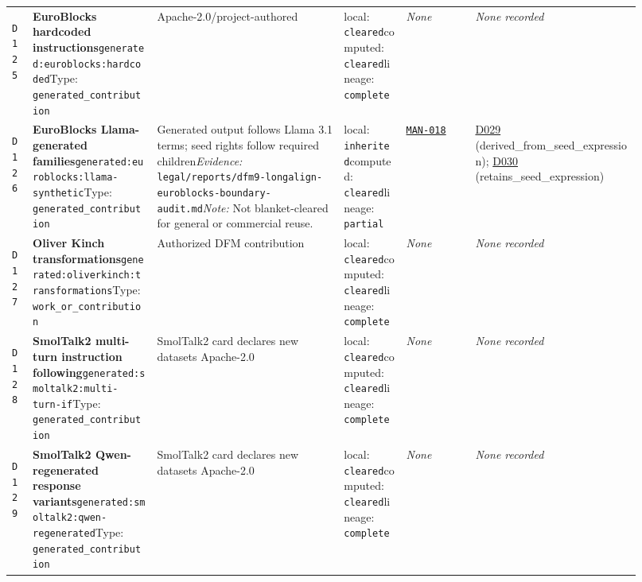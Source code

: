 \documentclass[9pt,a4paper]{article}
\newcommand{\depid}[1]{\hypertarget{dep:#1}{\texttt{#1}}}
\begin{document}
\begin{landscape}
\begin{longtable}{@{}L{0.035\linewidth}L{0.185\linewidth}L{0.27\linewidth}L{0.09\linewidth}L{0.10\linewidth}L{0.24\linewidth}@{}}
\depid{D125} & \textbf{EuroBlocks hardcoded instructions}\newline \nolinkurl{generated:euroblocks:hardcoded}\newline Type: \texttt{generated\_contribution} & Apache-2.0/project-authored & local: \texttt{cleared}\newline computed: \texttt{cleared}\newline lineage: \texttt{complete} & \textit{None} & \textit{None recorded} \\
\depid{D126} & \textbf{EuroBlocks Llama-generated families}\newline \nolinkurl{generated:euroblocks:llama-synthetic}\newline Type: \texttt{generated\_contribution} & Generated output follows Llama 3.1 terms; seed rights follow required children\newline \textit{Evidence:} \nolinkurl{legal/reports/dfm9-longalign-euroblocks-boundary-audit.md}\newline \textit{Note:} Not blanket-cleared for general or commercial reuse. & local: \texttt{inherited}\newline computed: \texttt{cleared}\newline lineage: \texttt{partial} & \hyperlink{manual:MAN-018}{\texttt{MAN-018}} & \hyperlink{dep:D029}{D029} (derived\_from\_seed\_expression); \hyperlink{dep:D030}{D030} (retains\_seed\_expression) \\
\depid{D127} & \textbf{Oliver Kinch transformations}\newline \nolinkurl{generated:oliverkinch:transformations}\newline Type: \texttt{work\_or\_contribution} & Authorized DFM contribution & local: \texttt{cleared}\newline computed: \texttt{cleared}\newline lineage: \texttt{complete} & \textit{None} & \textit{None recorded} \\
\depid{D128} & \textbf{SmolTalk2 multi-turn instruction following}\newline \nolinkurl{generated:smoltalk2:multi-turn-if}\newline Type: \texttt{generated\_contribution} & SmolTalk2 card declares new datasets Apache-2.0 & local: \texttt{cleared}\newline computed: \texttt{cleared}\newline lineage: \texttt{complete} & \textit{None} & \textit{None recorded} \\
\depid{D129} & \textbf{SmolTalk2 Qwen-regenerated response variants}\newline \nolinkurl{generated:smoltalk2:qwen-regenerated}\newline Type: \texttt{generated\_contribution} & SmolTalk2 card declares new datasets Apache-2.0 & local: \texttt{cleared}\newline computed: \texttt{cleared}\newline lineage: \texttt{complete} & \textit{None} & \textit{None recorded} \\

\end{longtable}
\end{landscape}
\end{document}
